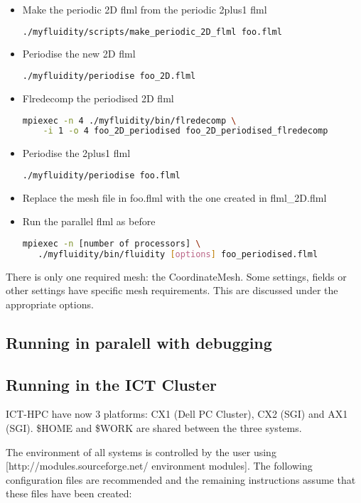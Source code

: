 \begin{itemize}
\item Make the periodic 2D flml from the periodic 2plus1 flml
\begin{lstlisting}[language=bash]
 ./myfluidity/scripts/make_periodic_2D_flml foo.flml
\end{lstlisting}
\item Periodise the new 2D flml
\begin{lstlisting}[language=bash]
 ./myfluidity/periodise foo_2D.flml
\end{lstlisting}
\item Flredecomp the periodised 2D flml
\begin{lstlisting}[language=bash]
mpiexec -n 4 ./myfluidity/bin/flredecomp \
    -i 1 -o 4 foo_2D_periodised foo_2D_periodised_flredecomp
\end{lstlisting}
\item Periodise the 2plus1 flml
\begin{lstlisting}[language=bash]
 ./myfluidity/periodise foo.flml
\end{lstlisting}
\item Replace the mesh file in foo.flml with the one created in flml\_2D.flml
\item Run the parallel flml as before
\begin{lstlisting}[language=bash]
mpiexec -n [number of processors] \
   ./myfluidity/bin/fluidity [options] foo_periodised.flml
\end{lstlisting}
\end{itemize}

There is only one required mesh: the CoordinateMesh. Some settings, fields or other
settings have specific mesh requirements. This are discussed under the appropriate options.

\subsection{Running in paralell with debugging}

\subsection{Running in the ICT Cluster}

ICT-HPC have now 3 platforms: CX1 (Dell PC Cluster), CX2 (SGI) and AX1 (SGI). \$HOME and \$WORK are shared between the three systems.

The environment of all systems is controlled by the user using [http://modules.sourceforge.net/ environment modules]. The following configuration files are recommended and the remaining instructions assume that these files have been created:

